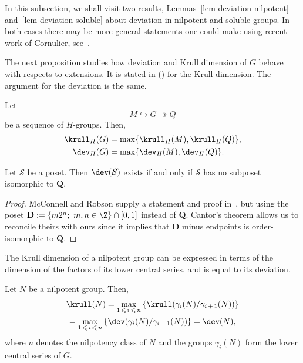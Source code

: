 \begin{rema}
In this subsection, we shall visit two results, Lemmas~\ref{lem-deviation nilpotent} and~\ref{lem-deviation soluble} about deviation in nilpotent and soluble groups. In both cases there may be more general statements one could make using recent work of Cornulier, see~\cite[Theorem~1.4]{Cor18}.
\end{rema}


The next proposition studies how deviation and Krull dimension of $G$ behave with respects to extensions. It is stated in (\cite[Lemma~2.24]{J}) for the Krull dimension. The argument for the deviation is the same.


\begin{lemm}\label{lem-kdim g gps2}
Let
\begin{equation*}
M \hookrightarrow G \twoheadrightarrow Q
\end{equation*}
be a sequence of $H$-groups. Then,
\begin{align*}
\krull_H (G) & = \max \{ \krull_H (M), \krull_H (Q)\}, \\
\dev_H(G) & = \max \{ \dev_H(M), \dev_H(Q)\}.
\end{align*}
\end{lemm}



\begin{lemm}
Let $\mathcal S$ be a poset. Then $\dev(\mathcal S)$ exists if and only if $\mathcal S$ has no subposet isomorphic to $\mathbf{Q}$.
\end{lemm}
\begin{proof}
McConnell and Robson supply a statement and proof in~\cite[Chapter~6, \S1.13]{MR}, but using the poset $\mathbf D:=\{m2^n;\ m,n\in\Z\}\cap[0,1]$ instead of $\mathbf Q$. Cantor's theorem allows us to reconcile theirs with ours since it implies that $\mathbf D$ minus endpoints is order-isomorphic to $\mathbf Q$.
\end{proof}



The Krull dimension of a nilpotent group can be expressed in terms of the dimension of the factors of its lower central series, and is equal to its deviation.

\begin{prop}\label{prop-Kr nilp}
Let $N$ be a nilpotent group. Then,
\begin{multline*}
\krull(N) = \max_{1\,\leqslant\,i\,\leqslant\,n} \left\{ \krull (\gamma_i(N) / \gamma_{i\,+\,1}(N)) \right\} \\
= \max_{1\,\leqslant\,i\,\leqslant\,n} \left\{ \dev (\gamma_i(N) / \gamma_{i\,+\,1}(N)) \right\} = \dev(N),
\end{multline*}
where $n$ denotes the nilpotency class of $N$ and the groups $\gamma_i(N)$ form the lower central series of $G$.
\end{prop}

